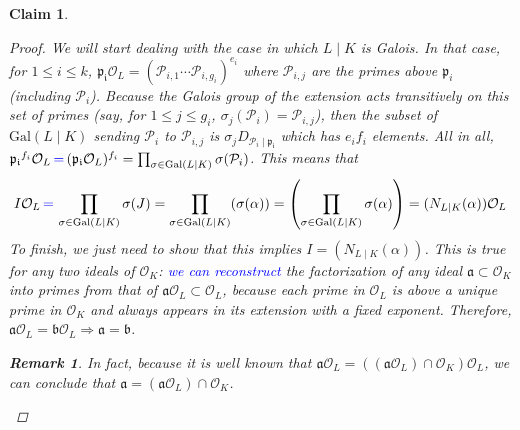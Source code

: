 \documentclass[11pt]{article}
\newtheorem{claim}[theorem]{Claim}
\theoremstyle{definition}
\newtheorem*{rk}{Remark}
\begin{document}
\begin{claim}
\begin{proof}
            \noindent We will start dealing with the case in which $L\mid K$ is Galois.
            In that case, for $1 \leq i \leq k$,\linebreak
            $\mathfrak{p_i}\mathcal{O}_L = (\mathcal{P}_{i,1} \cdots \mathcal{P}_{i, g_i})^{e_i}$
            where $\mathcal{P}_{i,j}$ are the primes above $\mathfrak{p}_i$ (including $\mathcal{P}_i$).
            Because the Galois group of the extension acts transitively on this set of primes
            (say, for $1 \leq j \leq g_i$, $\sigma_j(\mathcal{P}_{i}) = \mathcal{P}_{i, j}$),
            then the subset of $\text{Gal}(L \mid K)$ sending $\mathcal{P}_{i}$ to $\mathcal{P}_{i, j}$
            is $\sigma_j D_{\mathcal{P}_i \mid \mathfrak{p_i}}$ which has $e_i f_i$ elements.
            All in all,
            $\mathfrak{p_i}^{f_i}\mathcal{O}_L \, \textcolor{blue}{=} \, (\mathfrak{p_i}\mathcal{O}_L)^{f_i} =
            \prod_{\sigma \in \text{Gal}(L \mid K)}\sigma(\mathcal{P}_i)$.
            This means that \[I\mathcal{O}_L \, \textcolor{blue}{=} \, \prod_{\sigma \in \text{Gal}(L \mid K)}\sigma(J) =
            \prod_{\sigma \in \text{Gal}(L \mid K)}(\sigma(\alpha)) = \left(\prod_{\sigma \in \text{Gal}(L \mid K)}\sigma(\alpha)\right)
            = (N_{L \mid K}(\alpha))\mathcal{O}_L\]
            To finish, we just need to show that this implies $I = (N_{L \mid K}(\alpha))$.
            This is true for any two ideals of $\mathcal{O}_K$:
            \textcolor{blue}{ we can reconstruct } the factorization of any ideal
            $\mathfrak{a} \subset \mathcal{O}_K$ into primes from
            that of $\mathfrak{a}\mathcal{O}_L \subset \mathcal{O}_L$,
            because each prime in $\mathcal{O}_L$ is above a unique prime in $\mathcal{O}_K$
            and always appears in its extension with a fixed exponent.
            Therefore, $\mathfrak{a}\mathcal{O}_L = \mathfrak{b}\mathcal{O}_L \Rightarrow \mathfrak{a} = \mathfrak{b}$.

            \begin{rk}
                In fact, because it is well known that
                $\mathfrak{a}\mathcal{O}_L =
                ((\mathfrak{a}\mathcal{O}_L)\cap \mathcal{O}_K)\mathcal{O}_L$,
                we can conclude that
                $\mathfrak{a} = (\mathfrak{a}\mathcal{O}_L)\cap \mathcal{O}_K$.
            \end{rk}


\end{proof}
\end{claim}
\end{document}
